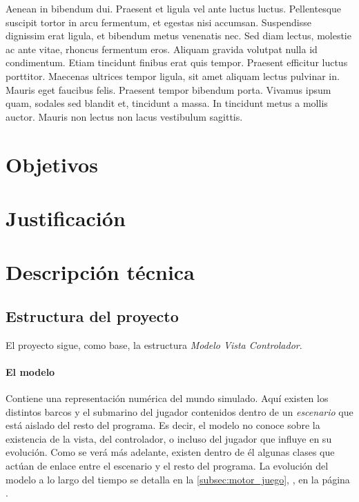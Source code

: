 \documentclass[a4paper,
	11pt,
	parskip=full,
	bibliography=totoc,
	twoside
	]{scrartcl}
\let\oldsection\section
\def\section{\cleardoubleoddpage\oldsection}
\begin{document}
	Aenean in bibendum dui. Praesent et ligula vel ante luctus luctus. Pellentesque suscipit tortor in arcu fermentum, et egestas nisi accumsan. Suspendisse dignissim erat ligula, et bibendum metus venenatis nec. Sed diam lectus, molestie ac ante vitae, rhoncus fermentum eros. Aliquam gravida volutpat nulla id condimentum. Etiam tincidunt finibus erat quis tempor. Praesent efficitur luctus porttitor. Maecenas ultrices tempor ligula, sit amet aliquam lectus pulvinar in. Mauris eget faucibus felis. Praesent tempor bibendum porta. Vivamus ipsum quam, sodales sed blandit et, tincidunt a massa. In tincidunt metus a mollis auctor. Mauris non lectus non lacus vestibulum sagittis. 

\section{Objetivos}
\label{sec:objetivos}

\section{Justificación}
\label{sec:justificacion}

\section{Descripción técnica}
\label{sec:desc_tecnica}
	\subsection{Estructura del proyecto}
	\label{subsec:estructura}
		El proyecto sigue, como base, la estructura \textit{Modelo Vista Controlador}.
		
		\paragraph{El modelo}
			Contiene una representación numérica del mundo simulado. Aquí existen los distintos barcos y el submarino del jugador contenidos dentro de un \textit{escenario} que está aislado del resto del programa. Es decir, el modelo no conoce sobre la existencia de la vista, del controlador, o incluso del jugador que influye en su evolución. Como se verá más adelante, existen dentro de él algunas clases que actúan de enlace entre el escenario y el resto del programa. La evolución del modelo a lo largo del tiempo se detalla en la \autoref{subsec:motor_juego}, , en la página \pageref{subsec:motor_juego}.
					
\end{document}
